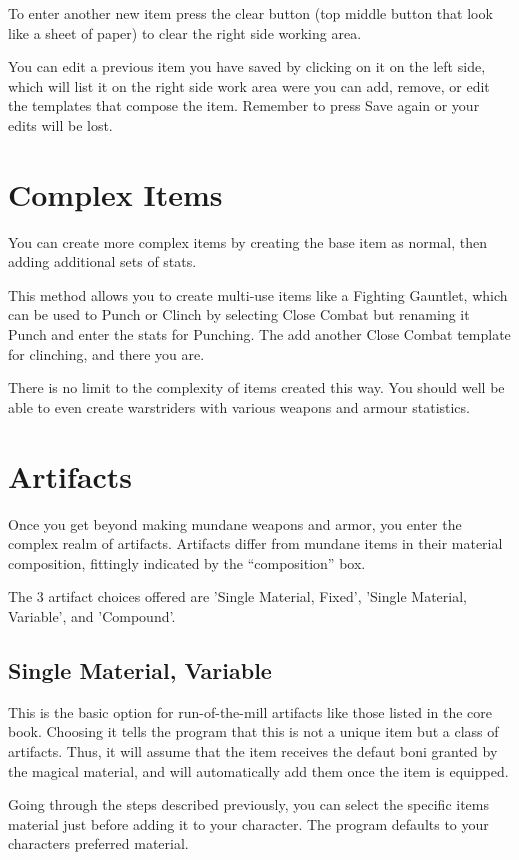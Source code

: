 To enter another new item press the clear button (top middle button that look like a sheet of paper) to clear the right side working area.

You can edit a previous item you have saved by clicking on it on the left side, which will list it on the right side work area were you can add, remove, or edit the templates that compose the item.  Remember to press Save again or your edits will be lost.

\section{Complex Items}
You can create more complex items by creating the base item as normal, then adding additional sets of stats.   

This method allows you to create multi-use items like a Fighting Gauntlet, which can be used to Punch or Clinch by selecting Close Combat but renaming it Punch and enter the stats for Punching.  The add another Close Combat template for clinching, and there you are.

There is no limit to the complexity of items created this way. You should well be able to even create warstriders with various weapons and armour statistics. 

\section{Artifacts}
Once you get beyond making mundane weapons and armor, you enter the complex realm of artifacts. Artifacts differ from mundane items in their material composition, fittingly indicated by the "`composition"' box.

The 3 artifact choices offered are 'Single Material, Fixed', 'Single Material, Variable', and 'Compound'.  

\subsection{Single Material, Variable}
This is the basic option for run-of-the-mill artifacts like those listed in the core book. Choosing it tells the program that this is not a unique item but a class of artifacts. Thus, it will assume that the item receives the defaut boni granted by the magical material, and will automatically add them once the item is equipped.

Going through the steps described previously, you can select the specific items material just before adding it to your character. The program defaults to your characters preferred material.
  
